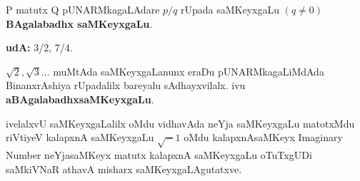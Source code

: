 {\rm P} matutx {\rm Q} pUNARMkagaLAdare $p/q$ rUpada saMKeyxgaLu $(q\neq 0)$ \textbf{BAgalabadhx saMKeyxgaLu}.

\textbf{udA:} {\rm 3/2, 7/4}.

${\sqrt 2}, {\sqrt 3}\ldots$ muMtAda saMKeyxgaLanunx eraDu pUNARMkagaLiMdAda BinanxrAshiya rUpadalilx bareyalu sAdhayxvilalx. ivu \textbf{aBAgalabadhxsaMKeyxgaLu}.

ivelalxvU saMKeyxgaLalilx oMdu vidhavAda neYja saMKeyxgaLu matotxMdu riVtiyeV kalapxnA  saMKeyxgaLu $\sqrt-1$ oMdu kalapxnAsaMKeyx {\rm Imaginary Number} neYjasaMKeyx matutx kalapxnA saMKeyxgaLu oTuTxgUDi saMkiVNaR athavA misharx saMKeyxgaLAgutatxve. 
